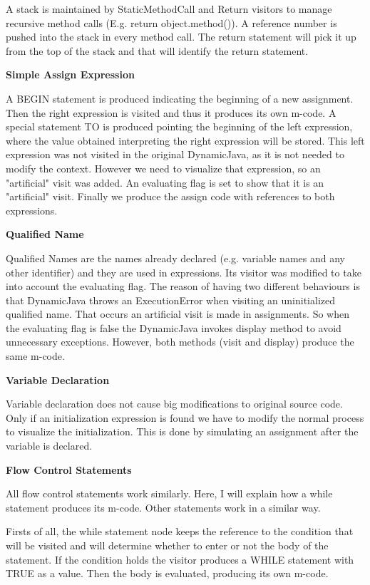 A stack is maintained by StaticMethodCall and Return visitors to manage recursive method calls (E.g. return object.method()). A reference number is pushed into the stack in every method call. The return statement will pick it up from the top of the stack and that will identify the return statement.

{\bf{Simple Assign Expression}}

A BEGIN statement is produced indicating the beginning of a new assignment. Then the right expression is visited and thus it produces its own m-code. A special statement TO is produced pointing the beginning of the left expression, where the value obtained interpreting the right expression will be stored. This left expression was not visited in the original DynamicJava, as it is not needed to modify the context. However we need to visualize that expression, so an "artificial" visit was added. An evaluating flag is set to show that it is an "artificial" visit. Finally we produce the assign code with references to both expressions.

{\bf{Qualified Name}}

Qualified Names are the names already declared (e.g. variable names and any other identifier) and they are used in expressions. Its visitor was modified to take into account the evaluating flag. The reason of having two different behaviours is that DynamicJava throws an ExecutionError when visiting an uninitialized qualified name. That occurs an artificial visit is made in assignments. So when the evaluating flag is false the DynamicJava invokes display method to avoid unnecessary exceptions.  However, both methods (visit and display) produce the same m-code.

{\bf{Variable Declaration}}

Variable declaration does not cause big modifications to original source code. Only if an initialization expression is found we have to modify the normal process to visualize the initialization. This is done by simulating an assignment after the variable is declared.

{\bf{Flow Control Statements}}

All flow control statements work similarly. Here, I will explain how a while statement produces its m-code. Other statements work in a similar way.

Firsts of all, the while statement node keeps the reference to the condition that will be visited and will determine whether to enter or not the body of the statement. If the condition holds the visitor produces a WHILE statement with TRUE as a value. Then the body is evaluated, producing its own m-code.

